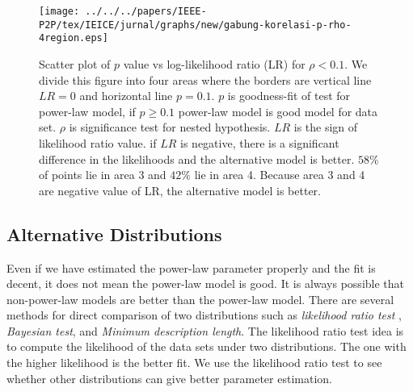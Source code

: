 \begin{figure}[!tb]
\begin{center}
\texttt{[image: ../../../papers/IEEE-P2P/tex/IEICE/jurnal/graphs/new/gabung-korelasi-p-rho-4region.eps]}
\end{center}
\caption{Scatter plot of $p$ value vs log-likelihood ratio (LR) for $\rho < 0.1$. 
We divide this figure into four areas where the borders are vertical line $LR=0$ and horizontal line $p = 0.1$.
$p$ is goodness-fit of test for power-law model, if $p \geq 0.1$ power-law model is good model for data set. $\rho$ is significance test for nested hypothesis.
$LR$ is the sign of likelihood ratio value.  
if $LR$ is negative, there is a significant difference in the likelihoods and the alternative model is better.
$58\%$ of points lie in area 3 and $42\%$ lie in area 4. 
Because area 3 and 4 are negative value of LR, the alternative model is better.
} 
\label{fig:scatter-pvalue-vs-lr-for-rho-le-01}
\end{figure}


\subsection{Alternative Distributions}
Even if we have estimated the power-law parameter properly and the fit is decent, it does not mean the power-law model is good.
It is always possible that non-power-law models are better than the power-law model.
There are several methods for direct comparison of two distributions such as \textit{likelihood ratio test} \cite{vuong1989likelihood}, \textit{Bayesian test}, and \textit{Minimum description length}.
The likelihood ratio test idea is to compute the likelihood of the data sets under two distributions. 
The one with the higher likelihood is the better fit. 
We use the likelihood ratio test to see whether other distributions can give better parameter estimation.

